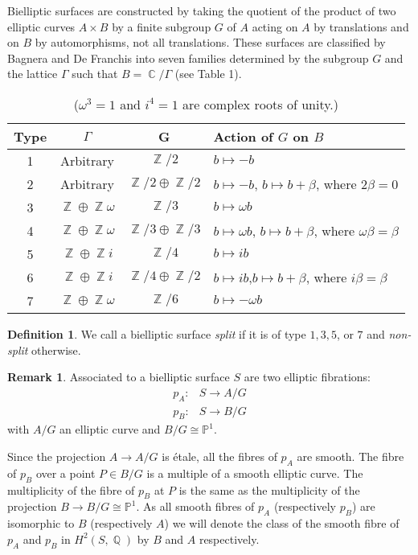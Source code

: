 \documentclass[a4paper, 12pt, twoside]{amsart}
\theoremstyle{plain}
\theoremstyle{definition}
\newtheorem{definition}[theorem]{Definition}
\newtheorem{remark}[theorem]{Remark}
\DeclareMathOperator{\iso}{\cong}
\DeclareMathOperator{\C}{\mathbb{C}}
\DeclareMathOperator{\Z}{\mathbb{Z}}
\DeclareMathOperator{\Q}{\mathbb{Q}}
\begin{document}
Bielliptic surfaces are constructed by taking the quotient of the
product of two elliptic curves $A \times B$ by a finite subgroup $G$
of $A$ acting on $A$ by translations and on $B$ by automorphisms, not
all translations. These surfaces are classified by Bagnera and De
Franchis into seven families \cite[\S V.5]{MR2030225} determined by
the subgroup $G$ and the lattice $\Gamma$ such that $B = \C / \Gamma$
(see Table 1).

\begin{table}[!h]
\centering
  \begin{tabular}{ c | c | c | p{5cm}  }
    Type & $\Gamma$ & G & Action of $G$ on $B$ \\ \hline
    1 & Arbitrary & $\Z/2$ & $b \mapsto -b$\\ 
    2 & Arbitrary & $\Z/2 \oplus \Z/2 $ & $b \mapsto -b$, \newline $b \mapsto b + \beta$, where $2\beta = 0$\\ 
    3 & $\Z \oplus \Z \omega$ & $\Z/3 $ & $b \mapsto \omega b$ \\
    4 & $\Z \oplus \Z \omega$ & $\Z/3 \oplus \Z/3$  & $b \mapsto \omega b$, \newline $b \mapsto b + \beta$, where $\omega \beta = \beta$ \\
    5 & $\Z \oplus \Z i$ & $\Z/4$ & $b \mapsto ib$ \\ 
    6 & $\Z \oplus \Z i$ & $\Z/4 \oplus \Z /2$ & $b \mapsto ib$,\newline $b \mapsto b + \beta$, where $i\beta = \beta$ \\
    7 & $\Z \oplus \Z \omega$ & $\Z/6$ & $b \mapsto - \omega b$ \\ \hline
  \end{tabular}
\label{table:types-of-bielliptic-surfaces}
\caption{($\omega^3 = 1$ and $i^4 = 1$ are complex roots of unity.)}
\end{table}

\begin{definition}\label{def:split}
  We call a bielliptic surface \emph{split} if it is of type $1,3,5$,
  or $7$ and \emph{non-split} otherwise.
\end{definition}

\begin{remark}
  Associated to a bielliptic surface $S$ are two elliptic fibrations:
  \begin{align*}
    p_A \colon& S \to A/G\\
    p_B \colon& S \to B/G
  \end{align*}
  with $A/G$ an elliptic curve and $B/G \iso \mathbb{P}^1$.

  Since the projection $A \to A/G$ is \'{e}tale, all the fibres of
  $p_A$ are smooth.  The fibre of $p_B$ over a point $P \in B/G$ is a
  multiple of a smooth elliptic curve. The multiplicity of the fibre
  of $p_B$ at $P$ is the same as the multiplicity of the projection
  $B \to B /G \iso \mathbb{P}^1$. As all smooth fibres of $p_A$
  (respectively $p_B$) are isomorphic to $B$ (respectively $A$) we
  will denote the class of the smooth fibre of $p_A$ and $p_B$ in
  $H^2(S,\Q)$ by $B$ and $A$ respectively.
\end{remark}
\end{document}
